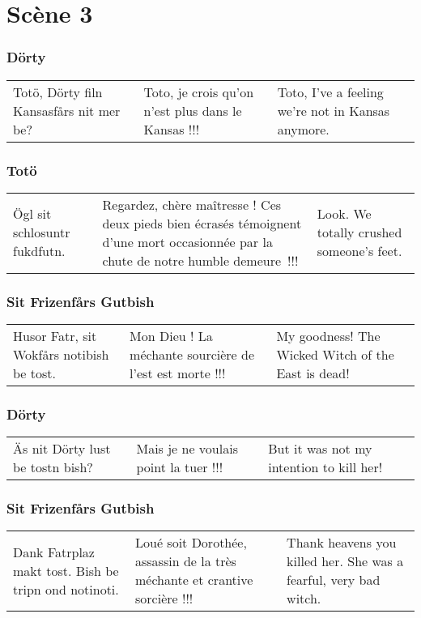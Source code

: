 \chapter*{Scène 3}
\subsection*{Dörty}
\begin{tabular}{p{3.7cm}|p{3.7cm}|p{3.7cm}}
Totö, Dörty filn Kansasfårs nit mer be?&
Toto, je crois qu'on n'est plus dans le Kansas !!!&
Toto, I've a feeling we're not in Kansas anymore.
\end{tabular}\par
\subsection*{Totö}
\begin{tabular}{p{3.7cm}|p{3.7cm}|p{3.7cm}}
Ögl sit schlosuntr fukdfutn.&
Regardez, chère maîtresse ! Ces deux pieds bien écrasés témoignent d'une
mort occasionnée par la chute de notre humble demeure~!!!&
Look. We totally crushed someone's feet.
\end{tabular}\par
\subsection*{Sit Frizenfårs Gutbish}
\begin{tabular}{p{3.7cm}|p{3.7cm}|p{3.7cm}}
Husor Fatr, sit Wokfårs notibish be tost.&
Mon Dieu ! La méchante sourcière de l'est est morte !!!&
My goodness! The Wicked Witch of the East is dead!
\end{tabular}\par
\subsection*{Dörty}
\begin{tabular}{p{3.7cm}|p{3.7cm}|p{3.7cm}}
Äs nit Dörty lust be tostn bish?&
Mais je ne voulais point la tuer !!!&
But it was not my intention to kill her!
\end{tabular}\par
\subsection*{Sit Frizenfårs Gutbish}
\begin{tabular}{p{3.7cm}|p{3.7cm}|p{3.7cm}}
Dank Fatrplaz makt tost. Bish be tripn ond notinoti.&
Loué soit Dorothée, assassin de la très méchante et crantive sorcière !!!&
Thank heavens you killed her. She was a fearful, very bad witch.
\end{tabular}\par

